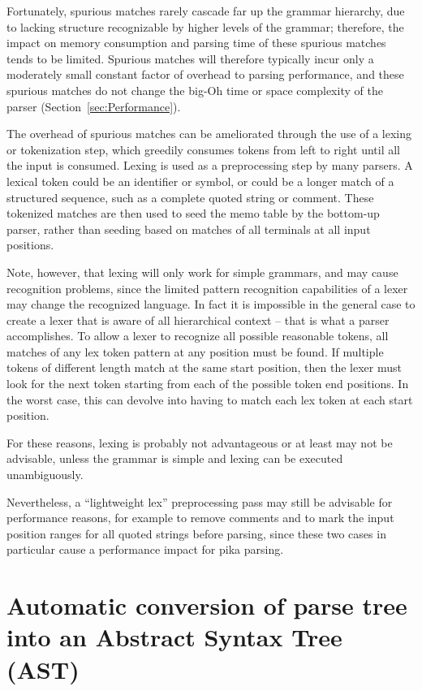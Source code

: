 \documentclass[manuscript,screen]{acmart}
\begin{document}
Fortunately, spurious matches rarely cascade far up the grammar hierarchy, due to lacking structure recognizable by higher levels of the grammar; therefore, the impact on memory consumption and parsing time of these spurious matches tends to be limited. Spurious matches will therefore typically incur only a moderately small constant factor of overhead to parsing performance, and these spurious matches do not change the big-Oh time or space complexity of the parser (Section~\ref{sec:Performance}).

The overhead of spurious matches can be ameliorated through the use of a lexing or tokenization step, which greedily consumes tokens from left to right until all the input is consumed. Lexing is used as a preprocessing step by many parsers. A lexical token could be an identifier or symbol, or could be a longer match of a structured sequence, such as a complete quoted string or comment. These tokenized matches are then used to seed the memo table by the bottom-up parser, rather than seeding based on matches of all terminals at all input positions.

Note, however, that lexing will only work for simple grammars, and may cause recognition problems, since the limited pattern recognition capabilities of a lexer may change the recognized language. In fact it is impossible in the general case to create a lexer that is aware of all hierarchical context -- that is what a parser accomplishes. To allow a lexer to recognize all possible reasonable tokens, all matches of any lex token pattern at any position must be found. If multiple tokens of different length match at the same start position, then the lexer must look for the next token starting from each of the possible token end positions. In the worst case, this can devolve into having to match each lex token at each start position.

For these reasons, lexing is probably not advantageous or at least may not be advisable, unless the grammar is simple and lexing can be executed unambiguously.

Nevertheless, a ``lightweight lex'' preprocessing pass may still be advisable for performance reasons, for example to remove comments and to mark the input position ranges for all quoted strings before parsing, since these two cases in particular cause a performance impact for pika parsing.

\section{Automatic conversion of parse tree into an Abstract Syntax Tree (AST)}
\end{document}

